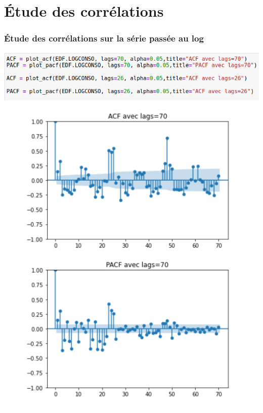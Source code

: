 \documentclass{beamer}
\theoremstyle{definition}
\begin{document}
\section{Étude des corrélations}

\begin{frame}
	\frametitle{Étude des corrélations sur la série passée au log }
	\begin{minipage}[t]{1\linewidth}
		\centering
		\includegraphics[width=0.8\linewidth]{10.png}
		\begin{minipage}[c]{0.48\linewidth}\centering\begin{figure}
				\centering
				\includegraphics[width=0.75\linewidth]{11.png}	
		\end{figure}\end{minipage}\hfill 
		\begin{minipage}[c]{0.48\linewidth}\centering\begin{figure}
				\begin{center}

\end{center}
\end{figure}
\end{minipage}
\end{minipage}
\end{frame}
\end{document}
